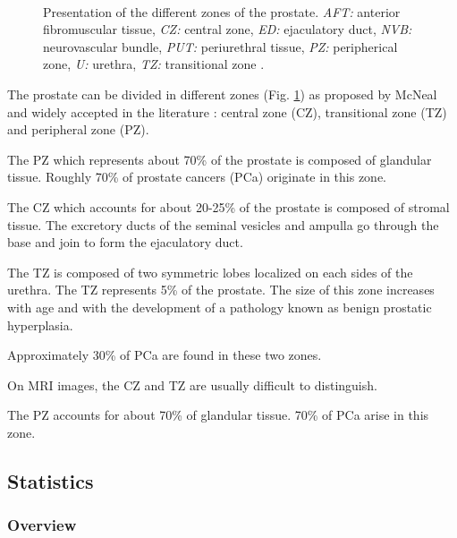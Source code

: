 \begin{figure}
	\centering
	~~~
	\caption{Presentation of the different zones of the prostate. \textit{AFT:} anterior fibromuscular tissue, \textit{CZ:} central zone, \textit{ED:} ejaculatory duct, \textit{NVB:} neurovascular bundle, \textit{PUT:} periurethral tissue, \textit{PZ:} peripherical zone, \textit{U:} urethra, \textit{TZ:} transitional zone \cite{Choi2007}.}
	\label{fig:intro:prostatecancer:anatomy:anatomyProstateZone}
\end{figure}

The prostate can be divided in different zones (Fig. \ref{fig:intro:prostatecancer:anatomy:anatomyProstateZone}) as proposed by McNeal \cite{McNeal1981} and widely accepted in the literature \cite{Hricak1987,Villers1991,Coakley2000,Parfait2010}: central zone (CZ\g), transitional zone (TZ\g) and peripheral zone (PZ\g).

The PZ which represents about 70\% of the prostate is composed of glandular tissue. Roughly 70\% of prostate cancers (PCa\g) originate in this zone.

The CZ which accounts for about 20-25\% of the prostate is composed of stromal tissue. The excretory ducts of the seminal vesicles and ampulla go through the base and join to form the ejaculatory duct.

The TZ is composed of two symmetric lobes localized on each sides of the urethra. The TZ represents 5\% of the prostate. The size of this zone increases with age and with the development of a pathology known as benign prostatic hyperplasia.

Approximately 30\% of PCa are found in these two zones.

On MRI images, the CZ and TZ are usually difficult to distinguish.

The PZ accounts for about 70\% of glandular tissue. 70\% of PCa arise in this zone.

\subsection{Statistics}\label{subsection:intro:prostatecancer:statistics}

\subsubsection{Overview}\label{subsubsection:intro:prostatecancer:statistics:overview}


